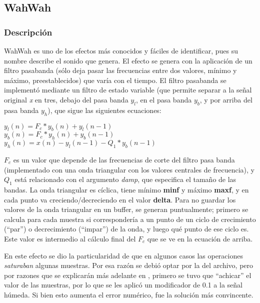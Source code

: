 \subsection{WahWah}
\label{subsec:desarrollo-wahwah}

\subsubsection{Descripción}
\label{subsec:desarrollo-wahwah-desc}

WahWah es uno de los efectos más conocidos y fáciles de identificar, pues su nombre describe el sonido que genera. El efecto se genera con la aplicación de un filtro pasabanda (sólo deja pasar las frecuencias entre dos valores, mínimo y máximo, preestablecidos) que varía con el tiempo. El filtro pasabanda se implementó mediante un filtro de estado variable (que permite separar a la señal original \textit{x} en tres, debajo del pasa banda $y_{l}$, en el pasa banda $y_{b}$, y por arriba del pasa banda $y_{h}$), que sigue las siguientes ecuaciones:

\begin{center}
 $y_{l}(n) = F_{c} * y_{b}(n) + y_{l}(n-1) $ \\
 $y_{b}(n) = F_{c} * y_{h}(n) + y_{b}(n-1) $\\
 $y_{h}(n) = x(n) - y_{l}(n-1) - Q_{1} * y_{b}(n-1)$
\end{center}

$F_{c}$ es un valor que depende de las frecuencias de corte del filtro pasa banda (implementado con una onda triangular con los valores centrales de frecuencia), y $Q_{1}$ está relacionado con el argumento \textit{damp}, que especifica el tamaño de las bandas. La onda triangular es cíclica, tiene mínimo \textbf{minf} y máximo \textbf{maxf}, y en cada punto va creciendo/decreciendo en el valor \textbf{delta}. Para no guardar los valores de la onda triangular en un buffer, se generan puntualmente; primero se calcula para cada muestra si correspondería a un punto de un ciclo de crecimiento (``par'') o decrecimiento (``impar'') de la onda, y luego qué punto de ese ciclo es. Este valor es intermedio al cálculo final del $F_{c}$ que se ve en la ecuación de arriba.

En este efecto se dio la particularidad de que en algunos casos las operaciones \textit{saturaban} algunas muestras. Por esa razón se debió optar por la  del archivo, pero por razones que se explicarán más adelante en , primero se tuvo que ``achicar'' el valor de las muestras, por lo que se les aplicó un modificador de 0.1 a la señal húmeda. Si bien esto aumenta el error numérico, fue la solución más convincente.


